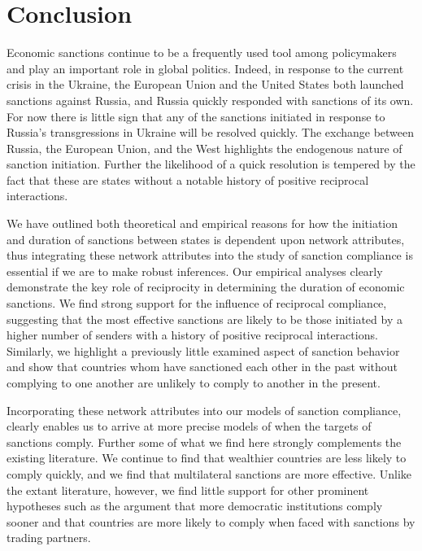 \section*{Conclusion}
\label{conclusion}

Economic sanctions continue to be a frequently used tool among policymakers and play an important role in global politics. Indeed, in response to the current crisis in the Ukraine, the European Union and the United States both launched sanctions against Russia, and Russia quickly responded with sanctions of its own. For now there is little sign that any of the sanctions initiated in response to Russia's transgressions in Ukraine will be resolved quickly. The exchange between Russia, the European Union, and the West highlights the endogenous nature of sanction initiation. Further the likelihood of a quick resolution is tempered by the fact that these are states without a notable history of positive reciprocal interactions. 


We have outlined both theoretical and empirical reasons for how the initiation and duration of sanctions between states is dependent upon network attributes, thus integrating these network attributes into the study of sanction compliance is essential if we are to make robust inferences. Our empirical analyses clearly demonstrate the key role of reciprocity in determining the duration of economic sanctions. We find strong support for the influence of reciprocal compliance, suggesting that the most effective sanctions are likely to be those initiated by a higher number of senders with a history of positive reciprocal interactions. Similarly, we highlight a previously little examined aspect of sanction behavior and show that countries whom have sanctioned each other in the past without complying to one another are unlikely to comply to another in the present. 

Incorporating these network attributes into our models of sanction compliance, clearly enables us to arrive at more precise models of when the targets of sanctions comply. Further some of what we find here strongly complements the existing literature. We continue to find that wealthier countries are less likely to comply quickly, and we find that multilateral sanctions are more effective. Unlike the extant literature, however, we find little support for other prominent hypotheses such as the argument that more democratic institutions comply sooner and that countries are more likely to comply when faced with sanctions by trading partners. 

